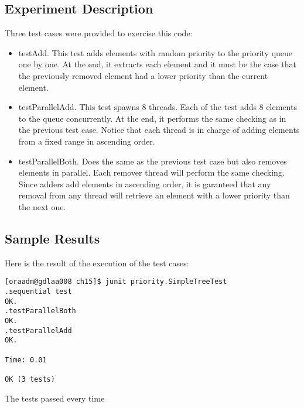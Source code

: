 \subsection{Experiment Description}
\par
Three test cases were provided to exercise this code:
\begin{itemize}
\item testAdd. This test adds elements with random priority to the priority
queue one by one. At the end, it extracts each element and it must be the case
that the previously removed element had a lower priority than the current
element. 
\item testParallelAdd. This test spawns 8 threads. Each of the test adds 8
elements to the queue concurrently. At the end, it performs the same checking as
in the previous test case. Notice that each thread is in charge of adding
elements from a fixed range in ascending order.
\item testParallelBoth. Does the same as the previous test case but also removes
elements in parallel. Each remover thread will perform the same checking. Since
adders add elements in ascending order, it is garanteed that any removal from
any thread will retrieve an element with a lower priority than the next one.
\end{itemize}
\par
\subsection{Sample Results}
\par
Here is the result of the execution of the test cases:
\par
\hfill
\begin{verbatim}
[oraadm@gdlaa008 ch15]$ junit priority.SimpleTreeTest
.sequential test
OK.
.testParallelBoth
OK.
.testParallelAdd
OK.

Time: 0.01

OK (3 tests)
\end{verbatim}
\hfill
\par
The tests passed every time
